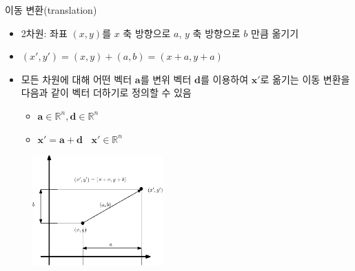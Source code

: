 \begin{frame}{이동 변환(translation)}

{\small
\begin{itemize}
\item 2차원: 좌표 $(x,y)$를 $x$ 축 방향으로 $a$, $y$ 축 방향으로 $b$ 만큼 옮기기
\item $(x', y') = (x,y) + (a,b) = (x+a, y+a)$
\end{itemize}

\begin{itemize}
\item 모든 차원에 대해
어떤 벡터 $\mathbf a$를 변위 벡터 $\mathbf d$를 이용하여 $\mathbf x'$로 옮기는 이동 변환을 다음과 같이 벡터 더하기로 정의할 수 있음
	\begin{itemize}
	\item $\mathbf a \in \mathbb R^n, \mathbf d \in \mathbb R^n$
	\item $\mathbf x' = \mathbf a + \mathbf d~~~~\mathbf x' \in \mathbb R^n$
	\end{itemize}
\end{itemize}


\begin{figure}
    \includegraphics[width=5cm]{Math_transform/translation.eps}
\end{figure}
}

\end{frame}


